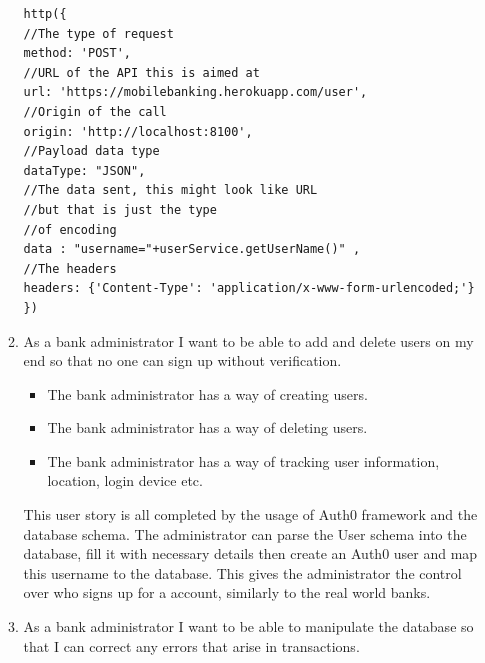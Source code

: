\begin{itemize}
\begin{enumerate}
\begin{verbatim}
http({
//The type of request
method: 'POST',
//URL of the API this is aimed at
url: 'https://mobilebanking.herokuapp.com/user',
//Origin of the call
origin: 'http://localhost:8100',
//Payload data type
dataType: "JSON",
//The data sent, this might look like URL
//but that is just the type
//of encoding
data : "username="+userService.getUserName()" ,
//The headers
headers: {'Content-Type': 'application/x-www-form-urlencoded;'}
})
\end{verbatim}
        \item As a bank administrator I want to be able to add and delete users on my end so that no one can sign up without verification.
        \begin{itemize}
                \item The bank administrator has a way of creating users.
                \item The bank administrator has a way of deleting users.
                \item The bank administrator has a way of tracking user information, location, login device etc.
            \end{itemize}
        This user story is all completed by the usage of Auth0 framework and the database schema. The administrator can parse the User schema into the database, fill it with necessary details then create an Auth0 user and map this username to the database.
        This gives the administrator the control over who signs up for a account, similarly to the real world banks.
        \item As a bank administrator I want to be able to manipulate the database so that I can correct any errors that arise in transactions.


\end{enumerate}
\end{itemize}
